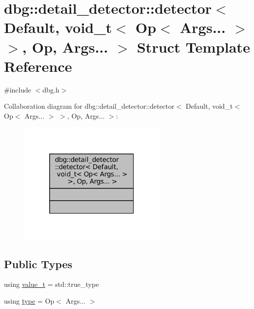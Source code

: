 \hypertarget{structdbg_1_1detail__detector_1_1detector_3_01_default_00_01void__t_3_01_op_3_01_args_8_8_8_01_4b82e02bb2aa06b0130d0ab9c715e6bdd}{}\section{dbg\+:\+:detail\+\_\+detector\+:\+:detector$<$ Default, void\+\_\+t$<$ Op$<$ Args... $>$ $>$, Op, Args... $>$ Struct Template Reference}
\label{structdbg_1_1detail__detector_1_1detector_3_01_default_00_01void__t_3_01_op_3_01_args_8_8_8_01_4b82e02bb2aa06b0130d0ab9c715e6bdd}


{\ttfamily \#include $<$dbg.\+h$>$}



Collaboration diagram for dbg\+:\+:detail\+\_\+detector\+:\+:detector$<$ Default, void\+\_\+t$<$ Op$<$ Args... $>$ $>$, Op, Args... $>$\+:
\nopagebreak
\begin{figure}[H]
\begin{center}
\leavevmode
\includegraphics[width=208pt]{structdbg_1_1detail__detector_1_1detector_3_01_default_00_01void__t_3_01_op_3_01_args_8_8_8_01_4ffacb250f020e9fbcf839d6589ab5b00}
\end{center}
\end{figure}
\subsection*{Public Types}
\begin{DoxyCompactItemize}
\item 
using \hyperlink{structdbg_1_1detail__detector_1_1detector_3_01_default_00_01void__t_3_01_op_3_01_args_8_8_8_01_4b82e02bb2aa06b0130d0ab9c715e6bdd_ab9dc20c0565be267d2d98b0e0f4a565b}{value\+\_\+t} = std\+::true\+\_\+type
\item 
using \hyperlink{structdbg_1_1detail__detector_1_1detector_3_01_default_00_01void__t_3_01_op_3_01_args_8_8_8_01_4b82e02bb2aa06b0130d0ab9c715e6bdd_a2119ba35e684b8292286546a1cea10d1}{type} = Op$<$ Args... $>$
\end{DoxyCompactItemize}



